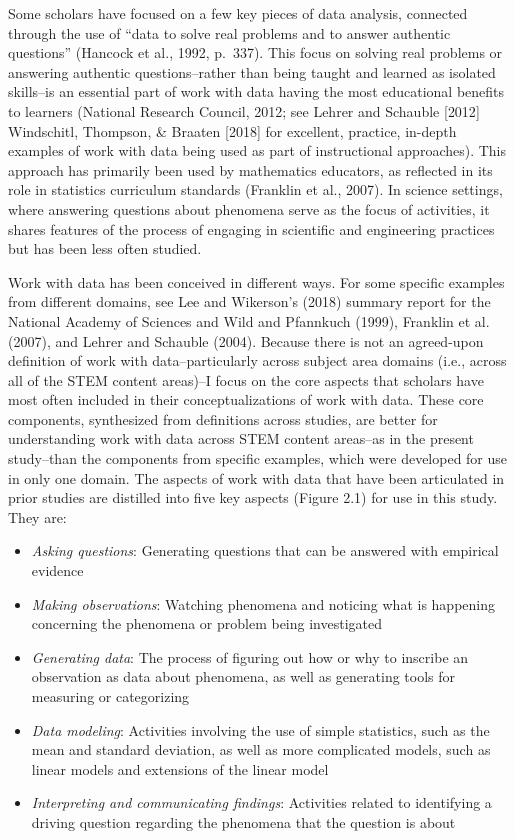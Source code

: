 \documentclass[]{book}
\providecommand{\tightlist}{%
  \setlength{\itemsep}{0pt}\setlength{\parskip}{0pt}}
\theoremstyle{definition}
\theoremstyle{definition}
\theoremstyle{definition}
\theoremstyle{remark}
\begin{document}
Some scholars have focused on a few key pieces of data analysis,
connected through the use of ``data to solve real problems and to answer
authentic questions'' (Hancock et al., 1992, p.~337). This focus on
solving real problems or answering authentic questions--rather than
being taught and learned as isolated skills--is an essential part of
work with data having the most educational benefits to learners
(National Research Council, 2012; see Lehrer and Schauble {[}2012{]}
Windschitl, Thompson, \& Braaten {[}2018{]} for excellent, practice,
in-depth examples of work with data being used as part of instructional
approaches). This approach has primarily been used by mathematics
educators, as reflected in its role in statistics curriculum standards
(Franklin et al., 2007). In science settings, where answering questions
about phenomena serve as the focus of activities, it shares features of
the process of engaging in scientific and engineering practices but has
been less often studied.

Work with data has been conceived in different ways. For some specific
examples from different domains, see Lee and Wikerson's (2018) summary
report for the National Academy of Sciences and Wild and Pfannkuch
(1999), Franklin et al. (2007), and Lehrer and Schauble (2004). Because
there is not an agreed-upon definition of work with data--particularly
across subject area domains (i.e., across all of the STEM content
areas)--I focus on the core aspects that scholars have most often
included in their conceptualizations of work with data. These core
components, synthesized from definitions across studies, are better for
understanding work with data across STEM content areas--as in the
present study--than the components from specific examples, which were
developed for use in only one domain. The aspects of work with data that
have been articulated in prior studies are distilled into five key
aspects (Figure 2.1) for use in this study. They are:

\begin{itemize}
\tightlist
\item
  \emph{Asking questions}: Generating questions that can be answered
  with empirical evidence
\item
  \emph{Making observations}: Watching phenomena and noticing what is
  happening concerning the phenomena or problem being investigated
\item
  \emph{Generating data}: The process of figuring out how or why to
  inscribe an observation as data about phenomena, as well as generating
  tools for measuring or categorizing
\item
  \emph{Data modeling}: Activities involving the use of simple
  statistics, such as the mean and standard deviation, as well as more
  complicated models, such as linear models and extensions of the linear
  model
\item
  \emph{Interpreting and communicating findings}: Activities related to
  identifying a driving question regarding the phenomena that the
  question is about
\end{itemize}
\end{document}
